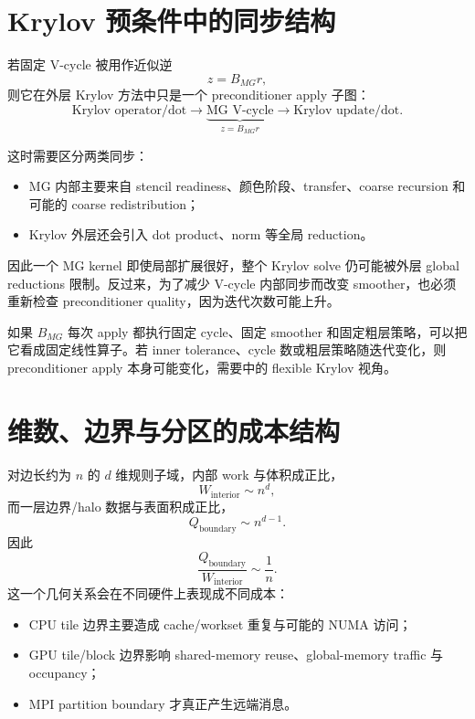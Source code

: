 \section{Krylov 预条件中的同步结构}

若固定 V-cycle 被用作近似逆
\begin{equation}
z=B_{MG}r,
\end{equation}
则它在外层 Krylov 方法中只是一个 preconditioner apply 子图：
\begin{equation}
\boxed{
\text{Krylov operator/dot}
\rightarrow
\underbrace{\text{MG V-cycle}}_{z=B_{MG}r}
\rightarrow
\text{Krylov update/dot}.
}
\label{eq:mg-parallel-preconditioned-krylov-dag}
\end{equation}

这时需要区分两类同步：

\begin{itemize}
\item MG 内部主要来自 stencil readiness、颜色阶段、transfer、coarse recursion 和可能的 coarse redistribution；
\item Krylov 外层还会引入 dot product、norm 等全局 reduction。
\end{itemize}

因此一个 MG kernel 即使局部扩展很好，整个 Krylov solve 仍可能被外层 global reductions 限制。反过来，为了减少 V-cycle 内部同步而改变 smoother，也必须重新检查 preconditioner quality，因为迭代次数可能上升。

如果 $B_{MG}$ 每次 apply 都执行固定 cycle、固定 smoother 和固定粗层策略，可以把它看成固定线性算子。若 inner tolerance、cycle 数或粗层策略随迭代变化，则 preconditioner apply 本身可能变化，需要中的 flexible Krylov 视角。

\section{维数、边界与分区的成本结构}

对边长约为 $n$ 的 $d$ 维规则子域，内部 work 与体积成正比，
\begin{equation}
W_{\mathrm{interior}}\sim n^d,
\end{equation}
而一层边界/halo 数据与表面积成正比，
\begin{equation}
Q_{\mathrm{boundary}}\sim n^{d-1}.
\end{equation}
因此
\begin{equation}
\frac{Q_{\mathrm{boundary}}}{W_{\mathrm{interior}}}
\sim
\frac1n.
\label{eq:mg-parallel-surface-volume}
\end{equation}
这一个几何关系会在不同硬件上表现成不同成本：
\begin{itemize}
\item CPU tile 边界主要造成 cache/workset 重复与可能的 NUMA 访问；
\item GPU tile/block 边界影响 shared-memory reuse、global-memory traffic 与 occupancy；
\item MPI partition boundary 才真正产生远端消息。
\end{itemize}

